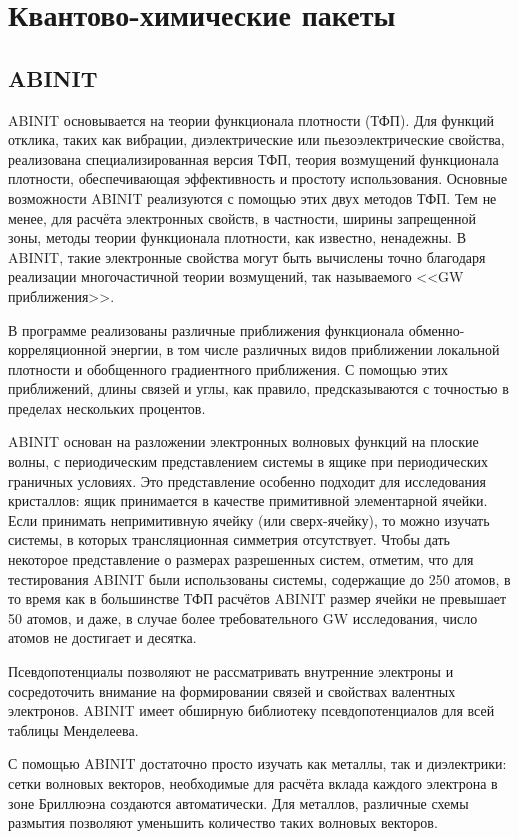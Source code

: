 \chapter{Квантово-химические пакеты}
\section{ABINIT}
ABINIT основывается на теории функционала плотности (ТФП). Для функций отклика, таких как вибрации, диэлектрические или пьезоэлектрические свойства, реализована специализированная версия ТФП, теория возмущений функционала плотности, обеспечивающая эффективность и простоту использования. Основные возможности ABINIT реализуются с помощью этих двух методов ТФП. Тем не менее, для расчёта электронных свойств, в частности, ширины запрещенной зоны, методы теории функционала плотности, как известно, ненадежны. В ABINIT, такие электронные свойства могут быть вычислены точно благодаря реализации многочастичной теории возмущений, так называемого <<GW приближения>>.

В программе реализованы различные приближения функционала обменно-корреляционной энергии, в том числе различных видов приближении локальной плотности и обобщенного градиентного приближения. С помощью этих приближений, длины связей и углы, как правило, предсказываются с точностью в пределах нескольких процентов.

ABINIT основан на разложении электронных волновых функций на плоские волны, с периодическим представлением системы в ящике при периодических граничных условиях. Это представление особенно подходит для исследования кристаллов: ящик принимается в качестве примитивной элементарной ячейки. Если принимать непримитивную ячейку (или сверх-ячейку), то можно изучать системы, в которых трансляционная симметрия отсутствует. Чтобы дать некоторое представление о размерах разрешенных систем, отметим, что для тестирования ABINIT были использованы системы, содержащие до 250 атомов, в то время как в большинстве ТФП расчётов ABINIT размер ячейки не превышает 50 атомов, и даже, в случае более требовательного GW исследования, число атомов не достигает и десятка.

Псевдопотенциалы позволяют не рассматривать внутренние электроны и сосредоточить внимание на формировании связей и свойствах валентных электронов. ABINIT имеет обширную библиотеку псевдопотенциалов для всей таблицы Менделеева.

С помощью ABINIT достаточно просто изучать как металлы, так и диэлектрики: сетки волновых векторов, необходимые для расчёта вклада каждого электрона в зоне Бриллюэна создаются автоматически. Для металлов, различные схемы размытия позволяют уменьшить количество таких волновых векторов.

